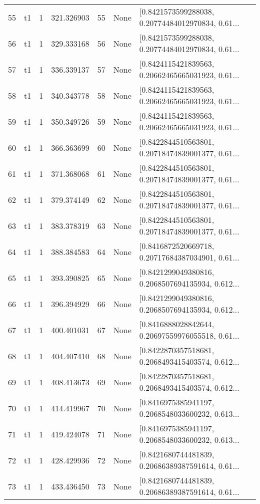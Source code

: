 \begin{tabular}{lllrlll}
55  &  t1 &   1 &  321.326903 &   55 &  None &  [0.8421573599288038, 0.20774484012970834, 0.61... \\
56  &  t1 &   1 &  329.333168 &   56 &  None &  [0.8421573599288038, 0.20774484012970834, 0.61... \\
57  &  t1 &   1 &  336.339137 &   57 &  None &  [0.8424115421839563, 0.20662465665031923, 0.61... \\
58  &  t1 &   1 &  340.343778 &   58 &  None &  [0.8424115421839563, 0.20662465665031923, 0.61... \\
59  &  t1 &   1 &  350.349726 &   59 &  None &  [0.8424115421839563, 0.20662465665031923, 0.61... \\
60  &  t1 &   1 &  366.363699 &   60 &  None &  [0.8422844510563801, 0.20718474839001377, 0.61... \\
61  &  t1 &   1 &  371.368068 &   61 &  None &  [0.8422844510563801, 0.20718474839001377, 0.61... \\
62  &  t1 &   1 &  379.374149 &   62 &  None &  [0.8422844510563801, 0.20718474839001377, 0.61... \\
63  &  t1 &   1 &  383.378319 &   63 &  None &  [0.8422844510563801, 0.20718474839001377, 0.61... \\
64  &  t1 &   1 &  388.384583 &   64 &  None &  [0.8416872520669718, 0.20717684387034901, 0.61... \\
65  &  t1 &   1 &  393.390825 &   65 &  None &  [0.8421299049380816, 0.2068507694135934, 0.612... \\
66  &  t1 &   1 &  396.394929 &   66 &  None &  [0.8421299049380816, 0.2068507694135934, 0.612... \\
67  &  t1 &   1 &  400.401031 &   67 &  None &  [0.8416888028842644, 0.20697559976055518, 0.61... \\
68  &  t1 &   1 &  404.407410 &   68 &  None &  [0.8422870357518681, 0.2068493415403574, 0.612... \\
69  &  t1 &   1 &  408.413673 &   69 &  None &  [0.8422870357518681, 0.2068493415403574, 0.612... \\
70  &  t1 &   1 &  414.419967 &   70 &  None &  [0.8416975385941197, 0.2068548033600232, 0.613... \\
71  &  t1 &   1 &  419.424078 &   71 &  None &  [0.8416975385941197, 0.2068548033600232, 0.613... \\
72  &  t1 &   1 &  428.429936 &   72 &  None &  [0.8421680744481839, 0.20686389387591614, 0.61... \\
73  &  t1 &   1 &  433.436450 &   73 &  None &  [0.8421680744481839, 0.20686389387591614, 0.61... \\

\end{tabular}

